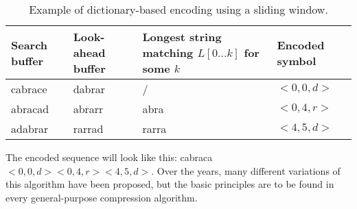 \begin{table}[!htbp]
\centering
\begin{tabular}{p{1.5cm}|p{2.5cm}|p{3.5cm}|p{2cm}}
\textbf{Search buffer} & \textbf{Look-ahead buffer} & \textbf{Longest string} \newline \textbf{matching} $L[0...k]$ \newline \textbf{for some} $k$ & \textbf{Encoded symbol} \\
\hline
cabrace          & dabrar & /     & $<0, 0, d>$ \\                
abracad          & abrarr & abra  & $<0, 4, r>$ \\ 
adabrar          & rarrad & rarra & $<4, 5, d>$ \\               
\end{tabular}
\caption{Example of dictionary-based encoding using a sliding window.}
\label{tab:lz}
\end{table}

The encoded sequence will look like this: cabraca$<0,0,d><0, 4, r><4, 5, d>$.
Over the years, many different variations of this algorithm have been proposed,
but the basic principles are to be found in every general-purpose compression algorithm.

